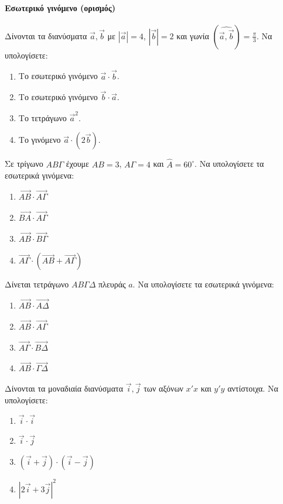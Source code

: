 \documentclass[11pt,a4paper,modern]{FFExercises}
\begin{document}
\paragraph{Εσωτερικό γινόμενο (ορισμός)}

\askhsh
Δίνονται τα διανύσματα $\vec{a}, \vec{b}$ με $|\vec{a}|=4$, $|\vec{b}|=2$ και γωνία $(\widehat{\vec{a},\vec{b}})=\frac{\pi}{3}$. Να υπολογίσετε:
\begin{enumerate}
    \item Το εσωτερικό γινόμενο $\vec{a}\cdot\vec{b}$.
    \item Το εσωτερικό γινόμενο $\vec{b}\cdot\vec{a}$.
    \item Το τετράγωνο $\vec{a}^2$.
    \item Το γινόμενο $\vec{a}\cdot(2\vec{b})$.
\end{enumerate}

\askhsh
Σε τρίγωνο $AB\Gamma$ έχουμε $AB=3$, $A\Gamma=4$ και $\hat{A}=60^\circ$. Να υπολογίσετε τα εσωτερικά γινόμενα:
\begin{enumerate}
    \item $\vec{AB}\cdot\vec{A\Gamma}$
    \item $\vec{BA}\cdot\vec{A\Gamma}$
    \item $\vec{AB}\cdot\vec{B\Gamma}$
    \item $\vec{A\Gamma}\cdot(\vec{AB}+\vec{A\Gamma})$
\end{enumerate}

\askhsh
Δίνεται τετράγωνο $AB\Gamma\Delta$ πλευράς $a$. Να υπολογίσετε τα εσωτερικά γινόμενα:
\begin{enumerate}
    \item $\vec{AB}\cdot\vec{A\Delta}$
    \item $\vec{AB}\cdot\vec{A\Gamma}$
    \item $\vec{A\Gamma}\cdot\vec{B\Delta}$
    \item $\vec{AB}\cdot\vec{\Gamma\Delta}$
\end{enumerate}

\askhsh
Δίνονται τα μοναδιαία διανύσματα $\vec{i}, \vec{j}$ των αξόνων $x'x$ και $y'y$ αντίστοιχα. Να υπολογίσετε:
\begin{enumerate}
    \item $\vec{i}\cdot\vec{i}$
    \item $\vec{i}\cdot\vec{j}$
    \item $(\vec{i}+\vec{j})\cdot(\vec{i}-\vec{j})$
    \item $|2\vec{i}+3\vec{j}|^2$
\end{enumerate}
\end{document}
